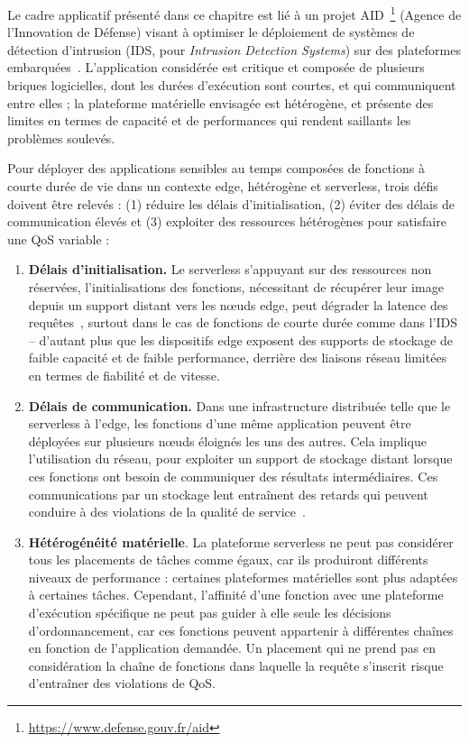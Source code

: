 Le cadre applicatif présenté dans ce chapitre est lié à un projet \gls{AID}~\footnote{\href{https://www.defense.gouv.fr/aid}{https://www.defense.gouv.fr/aid}} (Agence de l'Innovation de Défense) visant à optimiser le déploiement de systèmes de détection d'intrusion (\gls{IDS}, pour \textit{Intrusion Detection Systems}) sur des plateformes embarquées~\cite{SLIMANI2024}. L'application considérée est critique et composée de plusieurs briques logicielles, dont les durées d'exécution sont courtes, et qui communiquent entre elles ; la plateforme matérielle envisagée est hétérogène, et présente des limites en termes de capacité et de performances qui rendent saillants les problèmes soulevés.

Pour déployer des applications sensibles au temps composées de fonctions à courte durée de vie dans un contexte edge, hétérogène et serverless, trois défis doivent être relevés : (1) réduire les délais d'initialisation, (2) éviter des délais de communication élevés et (3) exploiter des ressources hétérogènes pour satisfaire une \gls{QoS} variable :

\begin{enumerate}
    \item \textbf{Délais d'initialisation.} Le serverless s'appuyant sur des ressources non réservées, l'initialisations des fonctions, nécessitant de récupérer leur image depuis un support distant vers les nœuds edge, peut dégrader la latence des requêtes~\cite{yanHermesEfficientCache2020}, surtout dans le cas de fonctions de courte durée comme dans l'\gls{IDS} -- d'autant plus que les dispositifs edge exposent des supports de stockage de faible capacité et de faible performance, derrière des liaisons réseau limitées en termes de fiabilité et de vitesse.
    \item \textbf{Délais de communication.} Dans une infrastructure distribuée telle que le serverless à l'edge, les fonctions d'une même application peuvent être déployées sur plusieurs nœuds éloignés les uns des autres. Cela implique l'utilisation du réseau, pour exploiter un support de stockage distant lorsque ces fonctions ont besoin de communiquer des résultats intermédiaires. Ces communications par un stockage lent entraînent des retards qui peuvent conduire à des violations de la qualité de service~\cite{wawrzoniakBoxerDataAnalytics2021a}.
    \item \textbf{Hétérogénéité matérielle}. La plateforme serverless ne peut pas considérer tous les placements de tâches comme égaux, car ils produiront différents niveaux de performance : certaines plateformes matérielles sont plus adaptées à certaines tâches. Cependant, l'affinité d'une fonction avec une plateforme d'exécution spécifique ne peut pas guider à elle seule les décisions d'ordonnancement, car ces fonctions peuvent appartenir à différentes chaînes en fonction de l'application demandée. Un placement qui ne prend pas en considération la chaîne de fonctions dans laquelle la requête s'inscrit risque d'entraîner des violations de \gls{QoS}.
\end{enumerate}


